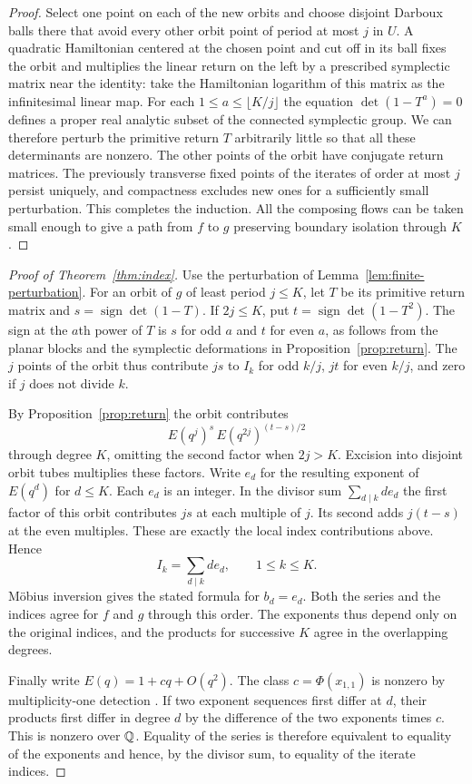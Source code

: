 \begin{proof}
Select one point on each of the new orbits and choose disjoint
Darboux balls there that avoid every other orbit point of period
at most $j$ in $U$. A quadratic Hamiltonian centered at the chosen
point and cut off in its ball fixes the orbit and multiplies the
linear return on the left by a prescribed symplectic matrix near
the identity: take the Hamiltonian logarithm of this matrix as the
infinitesimal linear map. For each $1\le a\le\lfloor K/j\rfloor$
the equation $\det(1-T^a)=0$ defines a proper real analytic subset
of the connected symplectic group. We can therefore perturb the
primitive return $T$ arbitrarily little so that all these
determinants are nonzero. The other points of the orbit have
conjugate return matrices. The previously transverse fixed points
of the iterates of order at most $j$ persist uniquely, and
compactness excludes new ones for a sufficiently small perturbation.
This completes the induction. All the composing flows can be taken
small enough to give a path from $f$ to $g$ preserving boundary
isolation through $K$.
\end{proof}

\begin{proof}[Proof of Theorem~\ref{thm:index}]
Use the perturbation of Lemma~\ref{lem:finite-perturbation}. For
an orbit of $g$ of least period $j\le K$, let $T$ be its primitive
return matrix and $s=\operatorname{sign}\det(1-T)$. If $2j\le K$,
put $t=\operatorname{sign}\det(1-T^2)$. The sign at the $a$th
power of $T$ is $s$ for odd $a$ and $t$ for even $a$, as follows
from the planar blocks and the symplectic deformations in
Proposition~\ref{prop:return}. The $j$ points of the orbit thus
contribute $js$ to $I_k$ for odd $k/j$, $jt$ for even $k/j$,
and zero if $j$ does not divide $k$.

By Proposition~\ref{prop:return} the orbit contributes
\[
       E(q^j)^s\, E(q^{2j})^{(t-s)/2}
\]
through degree $K$, omitting the second factor when $2j>K$.
Excision into disjoint orbit tubes multiplies these factors.
Write $e_d$ for the resulting exponent of $E(q^d)$ for $d\le K$.
Each $e_d$ is an integer. In the divisor sum $\sum_{d\mid k}d e_d$
the first factor of this orbit contributes $js$ at each multiple
of $j$. Its second adds $j(t-s)$ at the even multiples. These
are exactly the local index contributions above. Hence
\[
        I_k=\sum_{d\mid k} d e_d,\qquad 1\le k\le K .
\]
M\"obius inversion gives the stated formula for $b_d=e_d$.
Both the series and the indices agree for $f$ and $g$ through
this order. The exponents thus depend only on the original
indices, and the products for successive $K$ agree in the
overlapping degrees.

Finally write $E(q)=1+cq+O(q^2)$. The class $c=\Phi(x_{1,1})$
is nonzero by multiplicity-one detection \cite[Theorem~5.1]{WueProduct}.
If two exponent sequences first differ at $d$, their products
first differ in degree $d$ by the difference of the two exponents
times $c$. This is nonzero over $\mathbb Q$. Equality of the series is
therefore equivalent to equality of the exponents and hence, by
the divisor sum, to equality of the iterate indices.
\end{proof}


